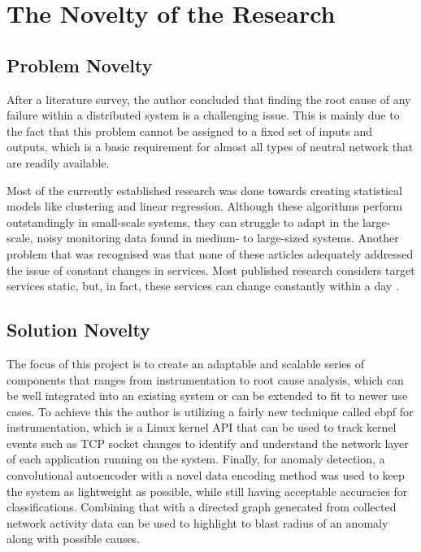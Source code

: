 \section{The Novelty of the Research}

\subsection{Problem Novelty}

After a literature survey, the author concluded that finding the root cause of any failure within a distributed system is a challenging issue. This is mainly due to the fact that this problem cannot be assigned to a fixed set of inputs and outputs, which is a basic requirement for almost all types of neutral network that are readily available. 


Most of the currently established research was done towards creating statistical models like clustering and linear regression. Although these algorithms perform outstandingly in small-scale systems, they can struggle to adapt in the large-scale, noisy monitoring data found in medium- to large-sized systems. Another problem that was recognised was that none of these articles adequately addressed the issue of constant changes in services. Most published research considers target services static, but, in fact, these services can change constantly within a day \citep{GoingtoM51:online}.

\subsection{Solution Novelty}


The focus of this project is to create an adaptable and scalable series of components that ranges from instrumentation to root cause analysis, which can be well integrated into an existing system or can be extended to fit to newer use cases. To achieve this the author is utilizing a fairly new technique called \ac{ebpf} for instrumentation, which is a Linux kernel API that can be used to track kernel events such as TCP socket changes to identify and understand the network layer of each application running on the system. Finally, for anomaly detection, a convolutional autoencoder with a novel data encoding method was used to keep the system as lightweight as possible, while still having acceptable accuracies for classifications. Combining that with a directed graph generated from collected network activity data can be used to highlight to blast radius of an anomaly along with possible causes.